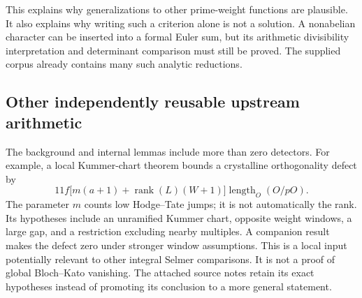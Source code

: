 This explains why generalizations to other prime-weight functions are
plausible. It also explains why writing such a criterion alone is not a
solution. A nonabelian character can be inserted into a formal Euler
sum, but its arithmetic divisibility interpretation and determinant
comparison must still be proved. The supplied corpus already contains
many such analytic reductions.

\subsection{Other independently reusable upstream arithmetic}

The background and internal lemmas include more than zero detectors.
For example, a local Kummer-chart theorem bounds a crystalline
orthogonality defect by
\[
 11f\bigl[m(a+1)+\operatorname{rank}(L)(W+1)\bigr]
       \operatorname{length}_O(O/pO).
\]
The parameter \(m\) counts low Hodge--Tate jumps; it is not automatically
the rank. Its hypotheses include an unramified Kummer chart, opposite
weight windows, a large gap, and a restriction excluding nearby
multiples. A companion result makes the defect zero under stronger
window assumptions.\cite{localdefect}
This is a local input potentially relevant to other integral Selmer
comparisons. It is not a proof of global Bloch--Kato vanishing.
The attached source notes retain its exact hypotheses instead of
promoting its conclusion to a more general statement.
